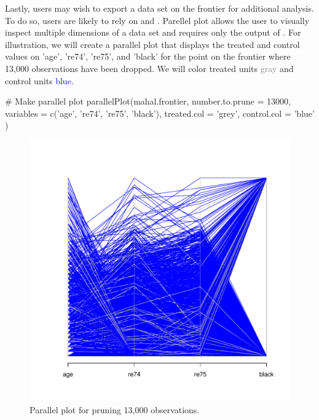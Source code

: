 \documentclass[nojss]{jss}
\begin{document}
Lastly, users may wish to export a data set on the frontier for
additional analysis. To do so, users are likely to rely on
 and . Parellel plot
allows the user to visually inspect multiple dimensions of a data set
and requires only the output of . For
illustration, we will create a parallel plot that displays 
the treated and control values on 'age', 're74', 're75', and
'black' for the point on the frontier where 13,000 observations
have been dropped. We will color treated units \textcolor{gray}{gray}
and control units \textcolor{blue}{blue}.

\begin{minipage}{0.45\textwidth}
\begin{CodeChunk}
\begin{CodeInput}
# Make parallel plot
parallelPlot(mahal.frontier, 
             number.to.prune = 13000, 
             variables = c('age', 
                           're74', 
                           're75', 
                           'black'),  
             treated.col = 'grey', 
             control.col = 'blue'
             )             
\end{CodeInput}
\end{CodeChunk}
\end{minipage}
\begin{minipage}{0.5\textwidth}
\begin{figure}[H]
\includegraphics{mahal_parplot.pdf}
\caption{\label{fig:mahal_parplot} Parallel plot for pruning 13,000 observations.}
\end{figure}
\end{minipage} \hfill
\newline
\newline
\end{document}
